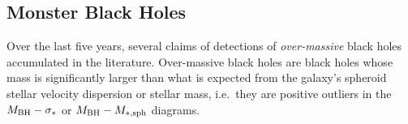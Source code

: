 %
%



\subsection{Monster Black Holes}
\label{sec:monsters}
Over the last five years, several claims of detections of \emph{over-massive} black holes accumulated in the literature. 
Over-massive black holes are black holes whose mass is significantly larger 
than what is expected from the galaxy's spheroid stellar velocity dispersion or stellar mass, 
i.e.~they are positive outliers in the $M_{\rm BH} - \sigma_*$ or $M_{\rm BH} - M_{\rm *,sph}$ diagrams. \\

